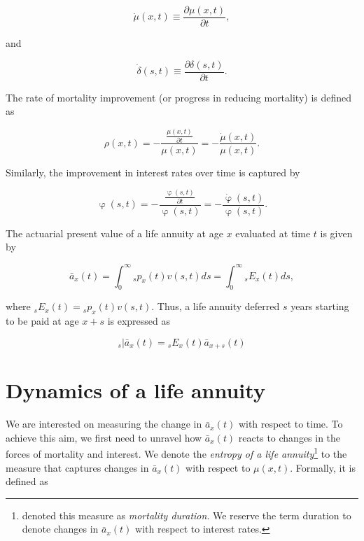 \documentclass[12pt]{article}
\begin{document}
\begin{equation} \label{eq:mudot}
\dot{\mu}(x,t)\equiv\frac{\partial\mu(x,t)}{\partial t},
\end{equation}

and 

\begin{equation} \label{eq:mudot}
\dot{\delta}(s,t)\equiv\frac{\partial\delta(s,t)}{\partial t}.
\end{equation}



The rate of mortality improvement (or progress in reducing mortality) is defined as


\begin{equation} \label{eq:rho}
\rho(x,t)=-\frac{\frac{\mu(x,t)}{\partial t}}{\mu(x,t)} = - \frac{\dot{\mu}(x,t)}{\mu(x,t)}.
\end{equation}

Similarly, the improvement in interest rates over time is captured by 


\begin{equation} \label{eq:phi}
\upvarphi(s,t)=-\frac{\frac{\upvarphi(s,t)}{\partial t}}{\upvarphi(s,t)} = - \frac{\dot{\upvarphi}(s,t)}{\upvarphi(s,t)}.
\end{equation}


The actuarial present value of a life annuity at age $x$ evaluated at time $t$ is given by

\begin{equation}\label{eq:Annuity}
\bar{a}_x(t) = \int_0^\infty {}_sp_x(t) {v}(s,t)ds = \int_0^\infty {}_sE_x(t) ds,
\end{equation}

where ${}_sE_x(t)={}_sp_x(t) {v}(s,t)$. Thus, a life annuity deferred $s$ years starting to be paid at age $x+s$ is expressed as


\begin{equation}\label{eq:DefAnnuity}
{}_s|\bar{a}_x(t) = {}_sE_x(t) \bar{a}_{x+s}(t)
\end{equation}


\section{Dynamics of a life annuity}


We are interested on measuring the change in $\bar{a}_x(t)$ with respect to time. To achieve this aim, we first need to unravel how $\bar{a}_x(t)$ reacts to changes in the forces of mortality and interest. We denote the \textit{entropy of a life annuity}\footnote{\cite{Tsai2011,Tsai2013a,Lin2020} denoted this measure as \textit{mortality duration}. We reserve the term duration to denote changes in $\bar{a}_x(t)$ with respect to interest rates.} to the measure that captures changes in $\bar{a}_x(t)$ with respect to $\mu(x,t)$. Formally, it is defined as 
\end{document}
